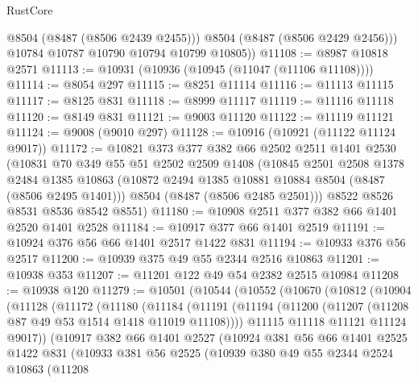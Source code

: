 \begin{lexlean}{RustCore}
\begin{coremodule}
            @8504
            (@8487 (@8506 @2439 @2455)))
          @8504
          (@8487 (@8506 @2429 @2456)))
        @10784
        @10787
        @10790
        @10794
        @10799
        @10805))
@11108 := @8987 @10818 @2571
@11113 := @10931 (@10936 (@10945 (@11047 (@11106 @11108))))
@11114 := @8054 @297
@11115 := @8251 @11114
@11116 := @11113 @11115
@11117 := @8125 @831
@11118 := @8999 @11117
@11119 := @11116 @11118
@11120 := @8149 @831
@11121 := @9003 @11120
@11122 := @11119 @11121
@11124 := @9008 (@9010 @297)
@11128 := @10916 (@10921 (@11122 @11124 @9017))
@11172 := @10821
    @373
    @377
    @382
    @66
    @2502
    @2511
    @1401
    @2530
    (@10831
      @70
      @349
      @55
      @51
      @2502
      @2509
      @1408
      (@10845
        @2501
        @2508
        @1378
        @2484
        @1385
        @10863
        (@10872 @2494 @1385 @10881 @10884 @8504 (@8487 (@8506 @2495 @1401)))
        @8504
        (@8487 (@8506 @2485 @2501)))
      @8522
      @8526
      @8531
      @8536
      @8542
      @8551)
@11180 := @10908 @2511 @377 @382 @66 @1401 @2520 @1401 @2528
@11184 := @10917 @377 @66 @1401 @2519
@11191 := @10924 @376 @56 @66 @1401 @2517 @1422 @831
@11194 := @10933 @376 @56 @2517
@11200 := @10939 @375 @49 @55 @2344 @2516 @10863
@11201 := @10938 @353
@11207 := @11201 @122 @49 @54 @2382 @2515 @10984
@11208 := @10938 @120
@11279 := @10501
    (@10544
      (@10552
        (@10670
          (@10812
            (@10904
              (@11128
                (@11172
                  (@11180
                    (@11184
                      (@11191
                        (@11194 (@11200 (@11207 (@11208 @87 @49 @53 @1514 @1418 @11019 @11108))))
                        @11115
                        @11118
                        @11121
                        @11124
                        @9017))
                    (@10917
                      @382
                      @66
                      @1401
                      @2527
                      (@10924
                        @381
                        @56
                        @66
                        @1401
                        @2525
                        @1422
                        @831
                        (@10933
                          @381
                          @56
                          @2525
                          (@10939
                            @380
                            @49
                            @55
                            @2344
                            @2524
                            @10863
                            (@11208

\end{coremodule}
\end{lexlean}
